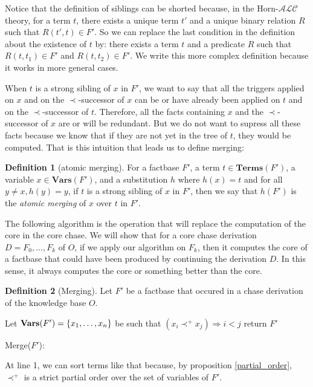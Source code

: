 \documentclass{article}
\theoremstyle{definition}
\newtheorem{definition}{Definition}[section]
\theoremstyle{remark}
\newcommand{\Vars}{\textbf{Vars}}
\newcommand{\Terms}{\textbf{Terms}}
\begin{document}
Notice that the definition of siblings can be shorted because, in the Horn-$\mathcal{ALC}$ theory, for a term $t$, there exists a unique term $t'$ and a unique binary relation $R$ such that $R(t',t)\in F'$. So we can replace the last condition in the definition about the existence of $t$ by: there exists a term $t$ and a predicate $R$ such that $R(t,t_1) \in F'$ and $R(t,t_2) \in F'$. We write this more complex definition because it works in more general cases.

When $t$ is a strong sibling of $x$ in $F'$, we want to say that all the triggers applied on $x$ and on the $\prec$-successor of $x$ can be or have already been applied on $t$ and on the $\prec$-successor of $t$. Therefore, all the facts containing $x$ and the $\prec$-successor of $x$ are or will be redundant. But we do not want to supress all these facts because we know that if they are not yet in the tree of $t$, they would be computed. That is this intuition that leads us to define merging:

\begin{definition}[atomic merging]
For a factbase $F'$, a term $t \in \Terms(F')$, a variable $x\in \Vars(F')$, and a substitution $h$ where $h(x) =t$ and for all $y \neq x, h(y)=y$, if $t$ is a strong sibling of $x$ in $F'$, then we say that $h(F')$ is the \emph{atomic merging} of $x$ over $t$ in $F'$.
\end{definition}

The following algorithm is the operation that will replace the computation of the core in the core chase. We will show that for a core chase derivation $D =F_0,...,F_k$ of $O$, if we apply our algorithm on $F_k$, then it computes the core of a factbase that could have been produced by continuing the derivation $D$. In this sense, it always computes the core or something better than the core.

\begin{definition}[Merging]
Let $F'$ be a factbase that occured in a chase derivation of the knowledge base $O$.

\begin{algorithm}[H]
\SetAlgoLined


    Let $\textbf{\Vars}(F') = \{x_1,\ldots, x_n\}$ be such that $(x_i \prec^+ x_j) \Rightarrow i < j$ \;
return $F'$
\caption{Merge($F'$):}


\end{algorithm}
At line 1, we can sort terms like that because, by proposition \ref{partial_order}, $\prec^+$ is a strict partial order over the set of variables of $F'$.
\end{definition}
\end{document}
